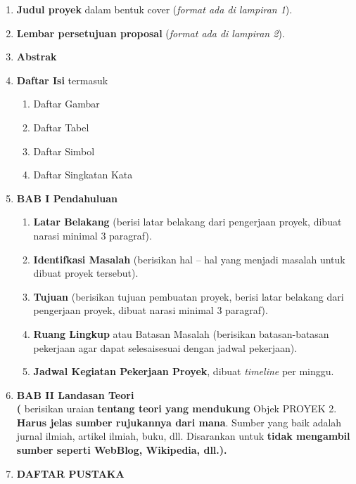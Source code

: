 \begin{enumerate}
  \item \textbf{Judul	proyek}	dalam	bentuk	cover (\textit{format	ada	di	lampiran	1}).
  
  \item \textbf{Lembar	persetujuan	proposal} (\textit{format	ada	di	lampiran	2}).
	
  \item \textbf{Abstrak}  
  
  \item \textbf{Daftar Isi} termasuk

  \begin{enumerate}
    \item Daftar Gambar
    \item Daftar Tabel
    \item Daftar Simbol
    \item Daftar Singkatan Kata
  \end{enumerate}
  
  \item \textbf{BAB I Pendahuluan}
  
  \begin{enumerate}
  	\item \textbf{Latar Belakang} (berisi	 latar	 belakang	 dari	 pengerjaan	 proyek,	 dibuat	 narasi	minimal	3	paragraf).
  	
  	\item \textbf{Identifkasi Masalah} (berisikan	hal	– hal	yang	menjadi	masalah	untuk	dibuat	proyek	tersebut).
  	
  	\item \textbf{Tujuan} (berisikan	 tujuan	 pembuatan	 proyek,	 berisi	 latar	 belakang	 dari pengerjaan proyek,	dibuat	narasi	minimal	3	paragraf).
  	
  	\item \textbf{Ruang Lingkup} atau	 Batasan	 Masalah (berisikan batasan-batasan	 pekerjaan	agar	dapat	selesaisesuai	dengan	jadwal	pekerjaan).
  	
  	\item \textbf{Jadwal Kegiatan Pekerjaan Proyek}, dibuat \textit{timeline} per minggu.
  \end{enumerate}
  
  \item \textbf{BAB II Landasan Teori} \\
   \textbf{(} berisikan uraian \textbf{tentang	 teori	 yang	mendukung} Objek	PROYEK	 2.	\textbf{Harus	 jelas	 sumber	 rujukannya	 dari mana}.  Sumber	 yang	 baik	 adalah	jurnal	 ilmiah,	 artikel	 ilmiah,	 buku,	 dll.	 	Disarankan	 untuk \textbf{tidak	 mengambil	 sumber	seperti	WebBlog,	Wikipedia,	dll.).}	

	\item \textbf{DAFTAR PUSTAKA}
\end{enumerate}

